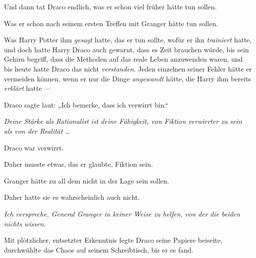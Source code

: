 Und dann tat Draco endlich, was er schon viel früher hätte tun sollen.

Was er schon nach seinem ersten Treffen mit Granger hätte tun sollen.

Was Harry Potter ihm \emph{gesagt} hatte, das er tun sollte, wofür er ihn \emph{trainiert} hatte, und doch hatte Harry Draco auch gewarnt, dass es Zeit brauchen würde, bis sein Gehirn begriff, dass die Methoden auf das reale Leben anzuwenden waren, und bis heute hatte Draco das nicht \emph{verstanden}. Jeden einzelnen seiner Fehler hätte er vermeiden können, wenn er nur die Dinge \emph{angewandt} hätte, die Harry ihm bereits \emph{erklärt} hatte —

Draco sagte laut:
„Ich bemerke, dass ich verwirrt bin.“

\emph{Deine Stärke als Rationalist ist deine Fähigkeit, von Fiktion verwirrter zu sein als von der Realität …}

Draco war verwirrt.

Daher musste etwas, das er glaubte, Fiktion sein.

Granger hätte zu all dem nicht in der Lage sein sollen.

Daher hatte sie es wahrscheinlich auch nicht.

\emph{Ich verspreche, General Granger in keiner Weise zu helfen, von der die beiden nichts wissen.}

Mit plötzlicher, entsetzter Erkenntnis fegte Draco seine Papiere beiseite, durchwühlte das Chaos auf seinem Schreibtisch, bis er es fand.

